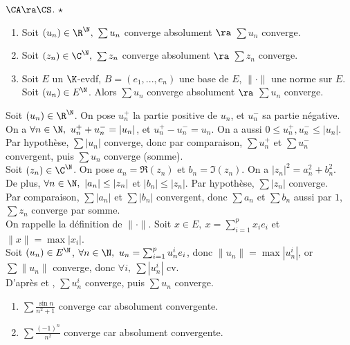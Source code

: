 \documentclass[11pt]{article}
\begin{document}
\begin{prop}{$\CA\ra\CS$. $\star$}{}
    \begin{enumerate}
        \item Soit $(u_n)\in\R^\N, ~ \sum u_n$ converge absolument $\ra$ $\sum u_n$ converge.
        \item Soit $(z_n)\in\C^\N, ~ \sum z_n$ converge absolument $\ra$ $\sum z_n$ converge.
        \item Soit $E$ un $\K$-evdf, $B=(e_1,...,e_n)$ une base de $E$, $\|\cdot\|$ une norme sur $E$.\\
        Soit $(u_n)\in E^\N$. Alors $\sum u_n$ converge absolument $\ra$ $\sum u_n$ converge.
    \end{enumerate}
    \tcblower
     Soit $(u_n)\in\R^\N$. On pose $u_n^+$ la partie positive de $u_n$, et $u_n^-$ sa partie négative.\\
    On a $\forall n \in \N, ~ u_n^+ + u_n^- = |u_n|$, et $u_n^+-u_n^-=u_n$. On a aussi $0\leq u_n^+,u_n^- \leq |u_n|$.\\
    Par hypothèse, $\sum |u_n|$ converge, donc par comparaison, $\sum u_n^+$ et $\sum u_n^-$ convergent, puis $\sum u_n$ converge (somme).\\
     Soit $(z_n)\in\C^\N$. On pose $a_n=\Re(z_n)$ et $b_n=\Im(z_n)$. On a $|z_n|^2=a_n^2+b_n^2$.\\
    De plus, $\forall n \in \N, ~ |a_n|\leq|z_n|$ et $|b_n|\leq|z_n|$. Par hypothèse, $\sum|z_n|$ converge.\\
    Par comparaison, $\sum |a_n|$ et $\sum |b_n|$ convergent, donc $\sum a_n$ et $\sum b_n$ aussi par $\boxed{1}$, $\sum z_n$ converge par somme.\\
     On rappelle la définition de $\|\cdot\|$. Soit $x\in E, ~ x = \sum_{i=1}^px_ie_i$ et $\|x\|=\max|x_i|$.\\
    Soit $(u_n)\in E^\N$, $\forall n \in \N, ~ u_n = \sum_{i=1}^pu_n^ie_i$, donc $\|u_n\|=\max|u_n^i|$, or $\sum\|u_n\|$ converge, donc $\forall i, ~ \sum|u_n^i|$ cv.\\
    D'après  et , $\sum u_n^i$ converge, puis $\sum u_n$ converge.
\end{prop}

\begin{ex}{}{}
    \begin{enumerate}
        \item $\sum \frac{\sin n}{n^2+1}$ converge car absolument convergente.
        \item $\sum\frac{(-1)^n}{n^2}$ converge car absolument convergente.
    \end{enumerate}
\end{ex}
\end{document}
